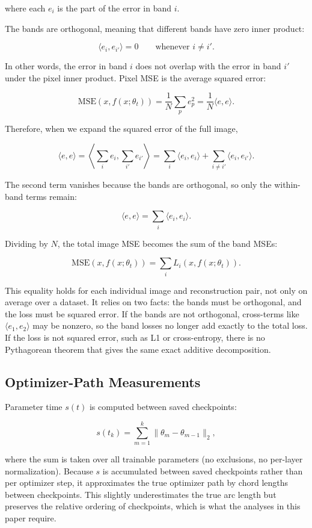 \documentclass{article}
\begin{document}
where each $e_i$ is the part of the error in band $i$.

The bands are orthogonal, meaning that different bands have zero inner
product:

\[
\langle e_i, e_{i'}\rangle = 0
\qquad \text{whenever } i \neq i'.
\]

In other words, the error in band $i$ does not overlap with the error
in band $i'$ under the pixel inner product. Pixel MSE is the average
squared error:

\[
\mathrm{MSE}(x,f(x;\theta_t))
=
\frac{1}{N}\sum_p e_p^2
=
\frac{1}{N}\langle e,e\rangle.
\]

Therefore, when we expand the squared error of the full image,

\[
\langle e,e\rangle
=
\left\langle \sum_i e_i,\sum_{i'} e_{i'} \right\rangle
=
\sum_i \langle e_i,e_i\rangle
+
\sum_{i\neq i'}\langle e_i,e_{i'}\rangle.
\]

The second term vanishes because the bands are orthogonal, so only the
within-band terms remain:

\[
\langle e,e\rangle
=
\sum_i \langle e_i,e_i\rangle.
\]

Dividing by $N$, the total image MSE becomes the sum of the band MSEs:

\[
\mathrm{MSE}(x,f(x;\theta_t))
=
\sum_i L_i(x,f(x;\theta_t)).
\]

This equality holds for each individual image and reconstruction pair,
not only on average over a dataset. It relies on two facts: the bands
must be orthogonal, and the loss must be squared error. If the bands are
not orthogonal, cross-terms like \(\langle e_1,e_2\rangle\) may be
nonzero, so the band losses no longer add exactly to the total loss. If
the loss is not squared error, such as L1 or cross-entropy, there is no
Pythagorean theorem that gives the same exact additive decomposition.

\subsection{Optimizer-Path Measurements}\label{app:optimizer-path-measurements}

Parameter time $s(t)$ is computed between saved checkpoints:

\[
s(t_k) = \sum_{m=1}^{k} \| \theta_m - \theta_{m-1} \|_2,
\]

where the sum is taken over all trainable parameters (no exclusions, no
per-layer normalization). Because $s$ is accumulated between saved
checkpoints rather than per optimizer step, it approximates the true
optimizer path by chord lengths between checkpoints. This slightly
underestimates the true arc length but preserves the relative ordering
of checkpoints, which is what the analyses in this paper require.
\end{document}
